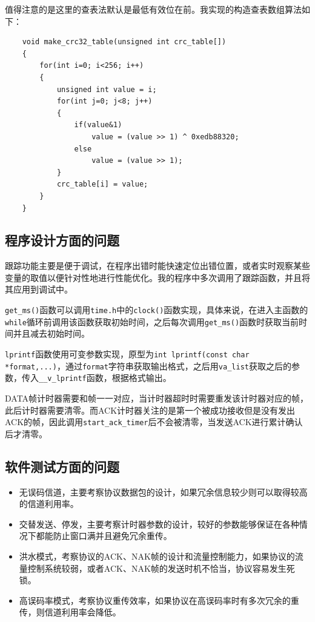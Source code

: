 \documentclass[lang=cn,11pt,a4paper,cite=authornum]{paper}
\begin{document}
值得注意的是这里的查表法默认是最低有效位在前。我实现的构造查表数组算法如下：

\begin{code}
\begin{verbatim}
    void make_crc32_table(unsigned int crc_table[])
    {
        for(int i=0; i<256; i++)
        {
            unsigned int value = i;
            for(int j=0; j<8; j++)
            {
                if(value&1)
                    value = (value >> 1) ^ 0xedb88320;
                else
                    value = (value >> 1);
            }
            crc_table[i] = value;
        }
    }
\end{verbatim}
\end{code}

\subsection{程序设计方面的问题}

跟踪功能主要是便于调试，在程序出错时能快速定位出错位置，或者实时观察某些变量的取值以便针对性地进行性能优化。我的程序中多次调用了跟踪函数，并且将其应用到调试中。

\texttt{get_ms()}函数可以调用\texttt{time.h}中的\texttt{clock()}函数实现，具体来说，在进入主函数的\texttt{while}循环前调用该函数获取初始时间，之后每次调用\texttt{get_ms()}函数时获取当前时间并且减去初始时间。

\texttt{lprintf}函数使用可变参数实现，原型为\texttt{int lprintf(const char *format,...)}，通过\texttt{format}字符串获取输出格式，之后用\texttt{va_list}获取之后的参数，传入\texttt{__v_lprintf}函数，根据格式输出。

DATA帧计时器需要和帧一一对应，当计时器超时时需要重发该计时器对应的帧，此后计时器需要清零。而ACK计时器关注的是第一个被成功接收但是没有发出ACK的帧，因此调用\texttt{start_ack_timer}后不会被清零，当发送ACK进行累计确认后才清零。

\subsection{软件测试方面的问题}

\begin{itemize}
    \item 无误码信道，主要考察协议数据包的设计，如果冗余信息较少则可以取得较高的信道利用率。
    \item 交替发送、停发，主要考察计时器参数的设计，较好的参数能够保证在各种情况下都能防止窗口满并且避免冗余重传。
    \item 洪水模式，考察协议的ACK、NAK帧的设计和流量控制能力，如果协议的流量控制系统较弱，或者ACK、NAK帧的发送时机不恰当，协议容易发生死锁。
    \item 高误码率模式，考察协议重传效率，如果协议在高误码率时有多次冗余的重传，则信道利用率会降低。
\end{itemize}
\end{document}
